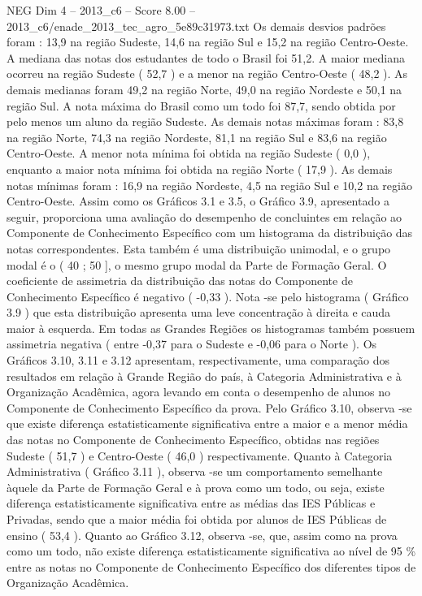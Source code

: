 \begin{textsample}{NEG Dim 4 – 2013\_c6 – Score 8.00 – 2013\_c6/enade\_2013\_tec\_agro\_5e89c31973.txt}
Os demais desvios padrões foram : 13,9 na região Sudeste, 14,6 na região Sul e 15,2 na região Centro-Oeste.
A mediana das notas dos estudantes de todo o Brasil foi 51,2.
A maior mediana ocorreu na região Sudeste ( 52,7 ) e a menor na região Centro-Oeste ( 48,2 ).
As demais medianas foram 49,2 na região Norte, 49,0 na região Nordeste e 50,1 na região Sul.
A nota máxima do Brasil como um todo foi 87,7, sendo obtida por pelo menos um aluno da região Sudeste.
As demais notas máximas foram : 83,8 na região Norte, 74,3 na região Nordeste, 81,1 na região Sul e 83,6 na região Centro-Oeste.
A menor nota mínima foi obtida na região Sudeste ( 0,0 ), enquanto a maior nota mínima foi obtida na região Norte ( 17,9 ).
As demais notas mínimas foram : 16,9 na região Nordeste, 4,5 na região Sul e 10,2 na região Centro-Oeste.
Assim como os Gráficos 3.1 e 3.5, o Gráfico 3.9, apresentado a seguir, proporciona uma avaliação do desempenho de concluintes em relação ao Componente de Conhecimento Específico com um histograma da distribuição das notas correspondentes.
Esta também é uma distribuição unimodal, e o grupo modal é o ( 40 ; 50 ], o mesmo grupo modal da Parte de Formação Geral.
O coeficiente de assimetria da distribuição das notas do Componente de Conhecimento Específico é negativo ( -0,33 ).
Nota -se pelo histograma ( Gráfico 3.9 ) que esta distribuição apresenta uma leve concentração à direita e cauda maior à esquerda.
Em todas as Grandes Regiões os histogramas também possuem assimetria negativa ( entre -0,37 para o Sudeste e -0,06 para o Norte ).
Os Gráficos 3.10, 3.11 e 3.12 apresentam, respectivamente, uma comparação dos resultados em relação à Grande Região do país, à Categoria Administrativa e à Organização Acadêmica, agora levando em conta o desempenho de alunos no Componente de Conhecimento Específico da prova.
Pelo Gráfico 3.10, observa -se que existe diferença estatisticamente significativa entre a maior e a menor média das notas no Componente de Conhecimento Específico, obtidas nas regiões Sudeste ( 51,7 ) e Centro-Oeste ( 46,0 ) respectivamente.
Quanto à Categoria Administrativa ( Gráfico 3.11 ), observa -se um comportamento semelhante àquele da Parte de Formação Geral e à prova como um todo, ou seja, existe diferença estatisticamente significativa entre as médias das IES Públicas e Privadas, sendo que a maior média foi obtida por alunos de IES Públicas de ensino ( 53,4 ).
Quanto ao Gráfico 3.12, observa -se, que, assim como na prova como um todo, não existe diferença estatisticamente significativa ao nível de 95 \% entre as notas no Componente de Conhecimento Específico dos diferentes tipos de Organização Acadêmica.

\end{textsample}
